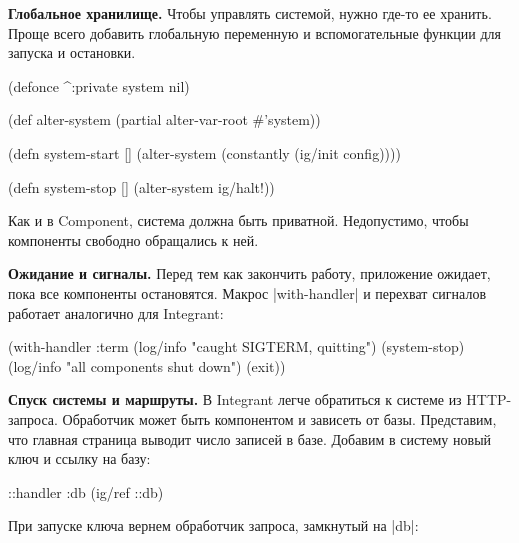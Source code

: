 \textbf{Глобальное хранилище.} Чтобы управлять системой, нужно где-то ее
хранить. Проще всего добавить глобальную переменную и вспомогательные функции
для запуска и остановки.

\begin{english}
  \begin{clojure}
(defonce ^:private system nil)

(def alter-system (partial alter-var-root #'system))

(defn system-start []
  (alter-system (constantly (ig/init config))))

(defn system-stop []
  (alter-system ig/halt!))
  \end{clojure}
\end{english}

Как и в Component, система должна быть приватной. Недопустимо, чтобы
компоненты свободно обращались к ней.

\textbf{Ожидание и сигналы.} Перед тем как закончить работу, приложение ожидает,
пока все компоненты остановятся. Макрос \spverb|with-handler| и перехват
сигналов работает аналогично для Integrant:

\begin{english}
  \begin{clojure}
(with-handler :term
  (log/info "caught SIGTERM, quitting")
  (system-stop)
  (log/info "all components shut down")
  (exit))
  \end{clojure}
\end{english}

\textbf{Спуск системы и маршруты.} В Integrant легче обратиться к
системе из HTTP-запроса. Обработчик может быть компонентом и зависеть от базы.
Представим, что главная страница выводит число записей в базе. Добавим в систему
новый ключ и ссылку на базу:

\begin{english}
  \begin{clojure}
{::handler {:db (ig/ref ::db)}}
  \end{clojure}
\end{english}

При запуске ключа вернем обработчик запроса, замкнутый на \spverb|db|:

\begin{english}
\end{english}

